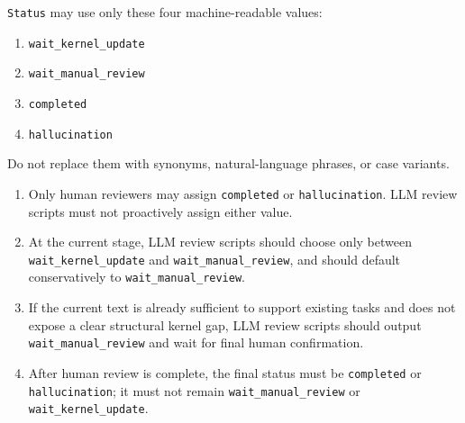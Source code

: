 \begin{tcolorbox}
\smallskip{}\par\smallskip

\noindent \texttt{Status} may use only these four machine-readable values:\par\smallskip

\begin{enumerate}[leftmargin=1.5em,noitemsep,topsep=2pt]
\item \texttt{wait\_kernel\_update}
\item \texttt{wait\_manual\_review}
\item \texttt{completed}
\item \texttt{hallucination}
\end{enumerate}

\noindent Do not replace them with synonyms, natural-language phrases, or case variants.\par\smallskip

\smallskip{}\par\smallskip

\begin{enumerate}[leftmargin=1.5em,noitemsep,topsep=2pt]
\item Only human reviewers may assign \texttt{completed} or \texttt{hallucination}. LLM review scripts must not proactively assign either value.
\item At the current stage, LLM review scripts should choose only between \texttt{wait\_kernel\_update} and \texttt{wait\_manual\_review}, and should default conservatively to \texttt{wait\_manual\_review}.
\item If the current text is already sufficient to support existing tasks and does not expose a clear structural kernel gap, LLM review scripts should output \texttt{wait\_manual\_review} and wait for final human confirmation.
\item After human review is complete, the final status must be \texttt{completed} or \texttt{hallucination}; it must not remain \texttt{wait\_manual\_review} or \texttt{wait\_kernel\_update}.
\end{enumerate}

\smallskip{}\par\smallskip


\end{tcolorbox}
